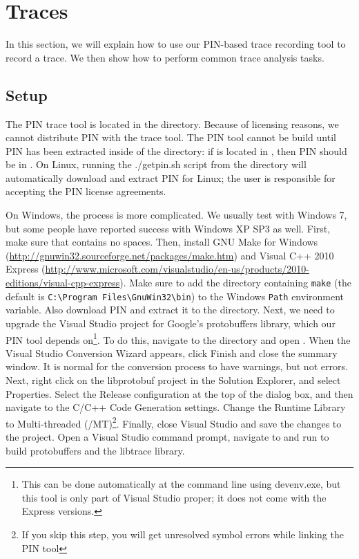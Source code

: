 \section{Traces}

In this section, we will explain how to use our PIN-based trace
recording tool to record a trace.  We then show how to perform common
trace analysis tasks.

\subsection{Setup}

The PIN trace tool is located in the  directory.
Because of licensing reasons, we cannot distribute PIN with the trace
tool.  The PIN tool cannot be build until PIN has been extracted
inside of the \bap directory: if \bap is located in
, then PIN should be in
.  On Linux, running the ./getpin.sh script
from the  directory will
automatically download and extract PIN for Linux; the user is
responsible for accepting the PIN license agreements.

On Windows, the process is more complicated.  We usually test with
Windows 7, but some people have reported success with Windows XP SP3
as well.  First, make sure that  contains no
spaces. Then, install GNU Make for Windows
(\url{http://gnuwin32.sourceforge.net/packages/make.htm}) and Visual
C++ 2010 Express
(\url{http://www.microsoft.com/visualstudio/en-us/products/2010-editions/visual-cpp-express}).
Make sure to add the directory containing \texttt{make} (the default
is \verb!C:\Program Files\GnuWin32\bin!) to the Windows \texttt{Path}
environment variable.  Also download PIN and extract it to the
 directory.  Next, we need to upgrade the
Visual Studio project for Google's protobuffers library, which our PIN
tool depends on\footnote{This can be done automatically at the command
  line using devenv.exe, but this tool is only part of Visual Studio
  proper; it does not come with the Express versions.}.  To do this,
navigate to the
directory and open .  When the Visual Studio
Conversion Wizard appears, click Finish and close the summary window.
It is normal for the conversion process to have warnings, but not
errors.  Next, right click on the libprotobuf project in the Solution
Explorer, and select Properties.  Select the Release configuration at
the top of the dialog box, and then navigate to the C/C++ Code
Generation settings.  Change the Runtime Library to Multi-threaded
(/MT)\footnote{If you skip this step, you will get unresolved symbol
  errors while linking the PIN tool}.  Finally, close Visual Studio
and save the changes to the project.  Open a Visual Studio command
prompt, navigate to 
and run  to build protobuffers and
the libtrace library.

